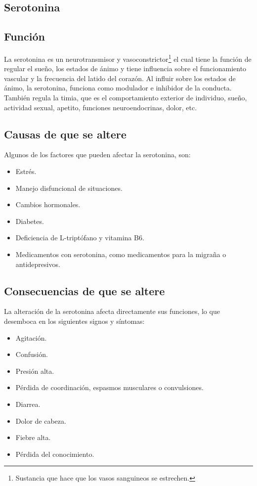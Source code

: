\vspace{0.5cm}

\begin{multicols}{2}


\section*{Serotonina}
\subsection*{Función}
La serotonina es un neurotransmisor y vasoconstrictor\footnote{Sustancia que hace que los vasos sanguineos se estrechen.} el cual tiene la función de regular el sueño, los estados de ánimo y tiene influencia sobre el funcionamiento vascular y la frecuencia del latido del corazón. Al influir sobre los estados de ánimo, la serotonina, funciona como modulador e inhibidor de la conducta. También regula la timia, que es el comportamiento exterior de individuo, sueño, actividad sexual, apetito, funciones neuroendocrinas, dolor, etc.
\subsection*{Causas de que se altere}
Algunos de los factores que pueden afectar la serotonina, son:
\begin{itemize}
	\item Estrés.
	\item Manejo disfuncional de situaciones.
	\item Cambios hormonales.
	\item Diabetes.
	\item Deficiencia de L-triptófano y vitamina B6.
	\item Medicamentos con serotonina, como medicamentos para la migraña o antidepresivos.
\end{itemize}
\subsection*{Consecuencias de que se altere}
La alteración de la serotonina afecta directamente sus funciones, lo que desemboca en los siguientes signos y síntomas:
\begin{itemize}
	\item Agitación.
	\item Confusión.
	\item Presión alta.
	\item Pérdida de coordinación, espasmos musculares o convulsiones.
	\item Diarrea.
	\item Dolor de cabeza.
	\item Fiebre alta.
	\item Pérdida del conocimiento.
\end{itemize} 




\end{multicols}
